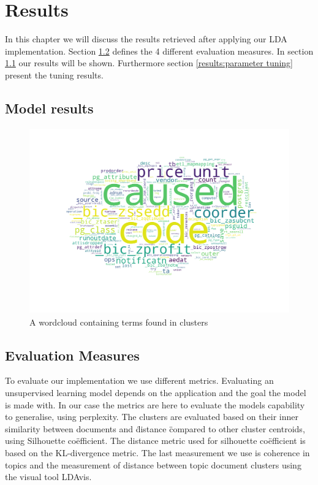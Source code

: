 \chapter{Results}
\label{ch:result}

In this chapter we will discuss the results retrieved after applying our LDA implementation. Section \ref{results:evaluation measures} defines the 4 different evaluation measures. In section \ref{results:modelresults} our results will be shown. Furthermore section \ref{results:parameter tuning} present the tuning results.

\section{Model results}\label{results:modelresults}


\begin{figure}[h]
    \centering
    \includegraphics[width=15cm, height=8cm]{figures/wc.png}
    \caption{A wordcloud containing terms found in clusters}
    \label{fig:worldcloud}
\end{figure}

\section{Evaluation Measures}\label{results:evaluation measures}
To evaluate our implementation we use different metrics. Evaluating an unsupervised learning model depends on the application and the goal the model is made with. In our case the metrics are here to evaluate the models capability to generalise, using perplexity. The clusters are evaluated based on their inner similarity between documents and \" distance \" compared to other cluster centroids, using Silhouette co\"efficient. The distance metric used for silhouette co\"efficient is based on the KL-divergence metric. The last measurement we use is coherence in topics and the measurement of distance between topic document clusters using the visual tool LDAvis.

